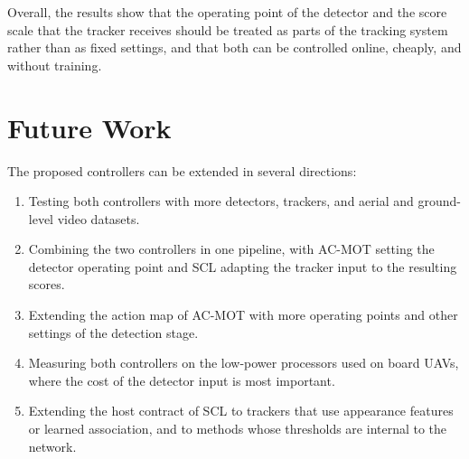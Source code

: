 Overall, the results show that the operating point of the detector and the score scale that the tracker receives should be treated as parts of the tracking system rather than as fixed settings, and that both can be controlled online, cheaply, and without training.

\section{Future Work}\label{sec:conc-future}
The proposed controllers can be extended in several directions:
\begin{enumerate}
\item Testing both controllers with more detectors, trackers, and aerial and ground-level video datasets.
\item Combining the two controllers in one pipeline, with AC-MOT setting the detector operating point and SCL adapting the tracker input to the resulting scores.
\item Extending the action map of AC-MOT with more operating points and other settings of the detection stage.
\item Measuring both controllers on the low-power processors used on board UAVs, where the cost of the detector input is most important.
\item Extending the host contract of SCL to trackers that use appearance features or learned association, and to methods whose thresholds are internal to the network.
\end{enumerate}
